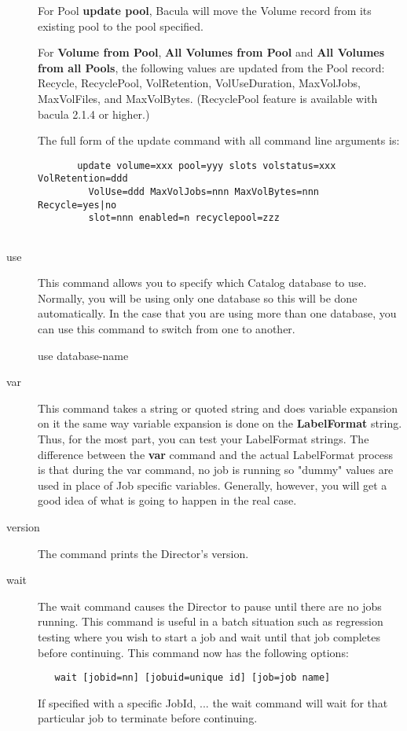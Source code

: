 \begin{description}
   For Pool {\bf update pool}, Bacula will move the Volume record from its
   existing pool to the pool specified.

   For {\bf Volume from Pool}, {\bf All Volumes from Pool} and {\bf All Volumes
     from all Pools}, the following values are updated from the Pool record:
   Recycle, RecyclePool, VolRetention, VolUseDuration, MaxVolJobs, MaxVolFiles,
   and MaxVolBytes.  (RecyclePool feature is available with bacula 2.1.4 or
   higher.)

   The full form of the update command with all command line arguments is:

\footnotesize
\begin{verbatim}
       update volume=xxx pool=yyy slots volstatus=xxx VolRetention=ddd
         VolUse=ddd MaxVolJobs=nnn MaxVolBytes=nnn Recycle=yes|no
         slot=nnn enabled=n recyclepool=zzz
      
\end{verbatim}
\normalsize

\item [use]
   This command allows you to specify which Catalog  database to use. Normally,
you will be using only one database so  this will be done automatically. In
the case that you are using  more than one database, you can use this command
to switch from  one to another.  

use \lt{}database-name\gt{} 

\item [var]
   \label{var}
   This command takes a string or quoted string and  does variable expansion on
   it the same way variable expansion  is done on the {\bf LabelFormat} string.
   Thus, for the  most part, you can test your LabelFormat strings. The
   difference  between the {\bf var} command and the actual LabelFormat process 
   is that during the var command, no job is running so "dummy"  values are
   used in place of Job specific variables. Generally,  however, you will get a
   good idea of what is going to happen  in the real case.  

\item [version]
   The command prints the Director's version.  

\item [wait]
   The wait command causes the Director to pause  until there are no jobs
   running. This command is useful in  a batch situation such as regression
   testing where you  wish to start a job and wait until that job completes 
   before continuing. This command now has the following options:
\footnotesize
\begin{verbatim}
   wait [jobid=nn] [jobuid=unique id] [job=job name]
\end{verbatim}
\normalsize
   If specified with a specific JobId, ... the wait command will wait
   for that particular job to terminate before continuing.

\end{description}

